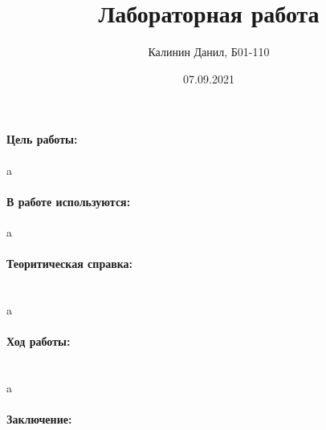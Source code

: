 \documentclass[a4paper, 12pt]{article}
\author{Калинин Данил, Б01-110}
\date{07.09.2021}
\title{Лабораторная работа }
\newcommand{\parag}[1]{\paragraph*{#1:}}
\begin{document}
\maketitle

\parag {Цель работы}
a
\parag {В работе используются}
a
\parag {Теоритическая справка} ~\\
a
\parag {Ход работы} ~\\
a
\parag {Заключение} ~\\
\end{document}
